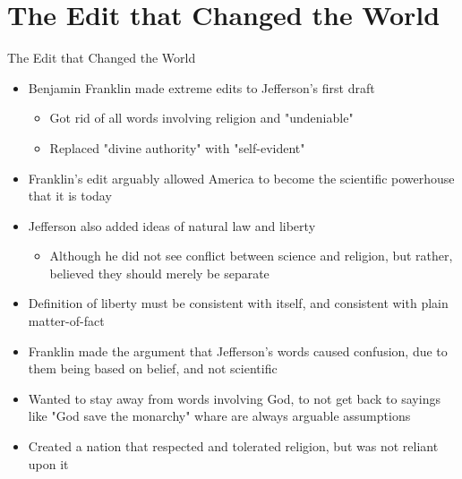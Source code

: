 \section{The Edit that Changed the World}
\begin{frame}{The Edit that Changed the World}{}
	\begin{itemize}
		\item Benjamin Franklin made extreme edits to Jefferson's first draft
			\begin{itemize}
				\item Got rid of all words involving religion and "undeniable"
				\item Replaced "divine authority" with "self-evident"
			\end{itemize}
		\item Franklin's edit arguably allowed America to become the scientific powerhouse that it is today
		\item Jefferson also added ideas of natural law and liberty
			\begin{itemize}
				\item Although he did not see conflict between science and religion, but rather, believed they should merely be separate
			\end{itemize}
		\item Definition of liberty must be consistent with itself, and consistent with plain matter-of-fact
		\item Franklin made the argument that Jefferson's words caused confusion, due to them being based on belief, and not scientific
		\item Wanted to stay away from words involving God, to not get back to sayings like "God save the monarchy" whare are always arguable assumptions
		\item Created a nation that respected and tolerated religion, but was not reliant upon it
	\end{itemize}
\end{frame}
